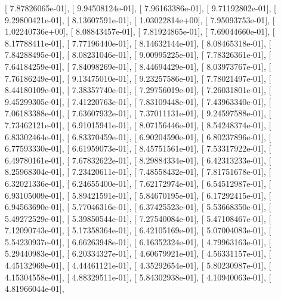 \documentclass{article}
\begin{document}
       [  7.87826065e-01],
       [  9.94508124e-01],
       [  7.96163386e-01],
       [  9.71192802e-01],
       [  9.29800421e-01],
       [  8.13607591e-01],
       [  1.03022814e+00],
       [  7.95093753e-01],
       [  1.02240736e+00],
       [  8.08843457e-01],
       [  7.81924865e-01],
       [  7.69044660e-01],
       [  8.17788411e-01],
       [  7.77196440e-01],
       [  8.14632144e-01],
       [  8.08465318e-01],
       [  7.84288495e-01],
       [  8.08231046e-01],
       [  9.00995225e-01],
       [  7.78326361e-01],
       [  7.64184259e-01],
       [  7.84098269e-01],
       [  8.44694429e-01],
       [  8.03973767e-01],
       [  7.76186249e-01],
       [  9.13475010e-01],
       [  9.23257586e-01],
       [  7.78021497e-01],
       [  8.44180109e-01],
       [  7.38357740e-01],
       [  7.29756019e-01],
       [  7.26031801e-01],
       [  9.45299305e-01],
       [  7.41220763e-01],
       [  7.83109448e-01],
       [  7.43963340e-01],
       [  7.06183388e-01],
       [  7.63607932e-01],
       [  7.37011131e-01],
       [  9.24597588e-01],
       [  7.73462121e-01],
       [  6.91015941e-01],
       [  8.07156446e-01],
       [  8.54248374e-01],
       [  6.83302464e-01],
       [  6.83370459e-01],
       [  6.90204590e-01],
       [  6.80237896e-01],
       [  6.77593330e-01],
       [  6.61959073e-01],
       [  8.45751561e-01],
       [  7.53317922e-01],
       [  6.49780161e-01],
       [  7.67832622e-01],
       [  8.29884334e-01],
       [  6.42313233e-01],
       [  8.25968304e-01],
       [  7.23420611e-01],
       [  7.48558432e-01],
       [  7.81751678e-01],
       [  6.32021336e-01],
       [  6.24655400e-01],
       [  7.62172974e-01],
       [  6.54512987e-01],
       [  6.93105009e-01],
       [  5.89421591e-01],
       [  5.84670195e-01],
       [  6.17292415e-01],
       [  6.94563690e-01],
       [  5.77046316e-01],
       [  6.37425523e-01],
       [  5.53668350e-01],
       [  5.49272529e-01],
       [  5.39850544e-01],
       [  7.27540084e-01],
       [  5.47108467e-01],
       [  7.12090743e-01],
       [  5.17358364e-01],
       [  6.42105169e-01],
       [  5.07004083e-01],
       [  5.54230937e-01],
       [  6.66263948e-01],
       [  6.16352324e-01],
       [  4.79963163e-01],
       [  5.29440983e-01],
       [  6.20334327e-01],
       [  4.60679921e-01],
       [  4.56331157e-01],
       [  4.45132969e-01],
       [  4.44461121e-01],
       [  4.35292654e-01],
       [  5.80230987e-01],
       [  4.15304558e-01],
       [  4.88329511e-01],
       [  5.84302938e-01],
       [  4.10940063e-01],
       [  4.81966044e-01],
\end{document}
